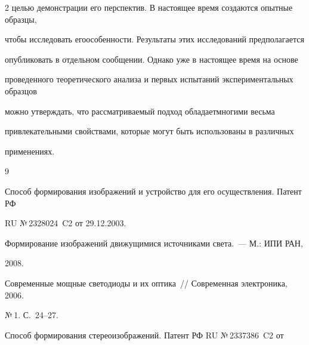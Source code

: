 \begin{multicols}{2}
целью демонстрации его перспектив. В настоящее время создаются опытные образцы, 

чтобы исследовать его\linebreak особенности. Результаты этих исследований предполагается 

опубликовать в отдельном сообщении. Однако уже в настоящее время на основе 

проведенного теоретического анализа и первых испытаний экспериментальных образцов 

можно утверждать, что рассматриваемый подход обладает\linebreak многими весьма 

привлекательными свойствами, которые могут быть использованы в различных 

применениях. 





     

{\small\frenchspacing

{%


\begin{thebibliography}{9}





  Способ формирования изображений и устройство для его осуществления. Патент РФ 

RU №\,2328024~C2 от 29.12.2003. 

  



  Формирование изображений движущимися источниками света.~--- М.: ИПИ РАН, 

2008. 

  



  Современные мощные светодиоды и их оптика~// Современная электроника, 2006. 

№\,1. С.~24--27.

  



  Способ формирования стереоизображений. Патент РФ RU №\,2337386~C2 от 


\end{thebibliography}}}
\end{multicols}
